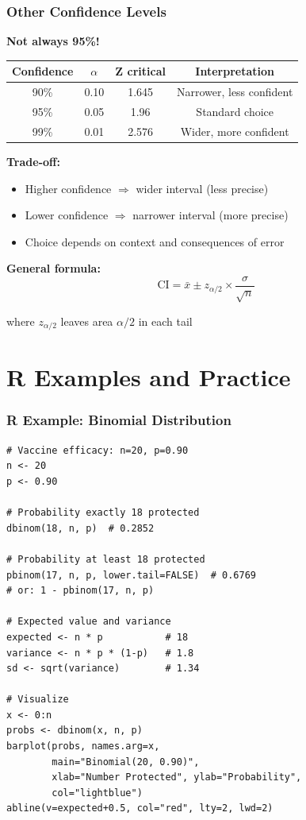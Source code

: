 \documentclass{beamer}
\begin{document}
\begin{frame}
\frametitle{Other Confidence Levels}
\textbf{Not always 95\%!}

\vspace{0.3cm}
\begin{center}
\begin{tabular}{cccc}
\toprule
Confidence & $\alpha$ & Z critical & Interpretation \\
\midrule
90\% & 0.10 & 1.645 & Narrower, less confident \\
95\% & 0.05 & 1.96 & Standard choice \\
99\% & 0.01 & 2.576 & Wider, more confident \\
\bottomrule
\end{tabular}
\end{center}

\vspace{0.3cm}
\textbf{Trade-off:}
\begin{itemize}
\item Higher confidence $\Rightarrow$ wider interval (less precise)
\item Lower confidence $\Rightarrow$ narrower interval (more precise)
\item Choice depends on context and consequences of error
\end{itemize}

\vspace{0.3cm}
\textbf{General formula:}
$$\text{CI} = \bar{x} \pm z_{\alpha/2} \times \frac{\sigma}{\sqrt{n}}$$

where $z_{\alpha/2}$ leaves area $\alpha/2$ in each tail
\end{frame}

\section{R Examples and Practice}

\begin{frame}[fragile]
\frametitle{R Example: Binomial Distribution}
\small
\begin{verbatim}
# Vaccine efficacy: n=20, p=0.90
n <- 20
p <- 0.90

# Probability exactly 18 protected
dbinom(18, n, p)  # 0.2852

# Probability at least 18 protected
pbinom(17, n, p, lower.tail=FALSE)  # 0.6769
# or: 1 - pbinom(17, n, p)

# Expected value and variance
expected <- n * p           # 18
variance <- n * p * (1-p)   # 1.8
sd <- sqrt(variance)        # 1.34

# Visualize
x <- 0:n
probs <- dbinom(x, n, p)
barplot(probs, names.arg=x,
        main="Binomial(20, 0.90)",
        xlab="Number Protected", ylab="Probability",
        col="lightblue")
abline(v=expected+0.5, col="red", lty=2, lwd=2)
\end{verbatim}
\end{frame}
\end{document}
